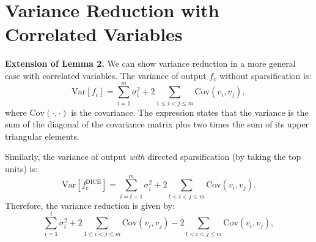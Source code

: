 \documentclass[runningheads]{llncs}
\begin{document}
\begin{table*}[htb] 
\caption[]{\small Effect of varying sparsity parameter $p$. Results are averaged on the test datasets described in Section~\ref{sec:experiments}.}
\label{tab:k-ablation}
\centering
\footnotesize
{}

\end{table*}


 

 
\section{Variance Reduction with Correlated Variables}
\label{sec:corr}

\noindent \textbf{Extension of Lemma 2.} We can show variance reduction in a more general case with correlated variables. The variance of output $f_c$ without sparsification is:
$$\mathrm{Var} [f_c] = \sum_{i=1}^{m} \sigma_i^2  + 2 \sum_{1\le i < j \le m} \mathrm{Cov}(v_i, v_j),$$
where $\mathrm{Cov}(\cdot ,\cdot )$ is the covariance. The expression states that the variance is the sum of the diagonal of the covariance matrix plus two times the sum of its upper triangular elements.

Similarly, the variance of output \emph{with} directed sparsification (by taking the top units) is:
$$\mathrm{Var} [f_c^\text{DICE}]= \sum_{i=t+1}^{m} \sigma_i^2  + 2 \sum_{t< i < j \le m} \mathrm{Cov}(v_i, v_j).$$
Therefore, the variance reduction is given by: $$\sum_{i=1}^{t} \sigma_i^2  + 2 \sum_{1\le i < j \le m} \mathrm{Cov}(v_i, v_j) - 2\sum_{t< i <j \le m} \mathrm{Cov}(v_i, v_j), $$
\end{document}
